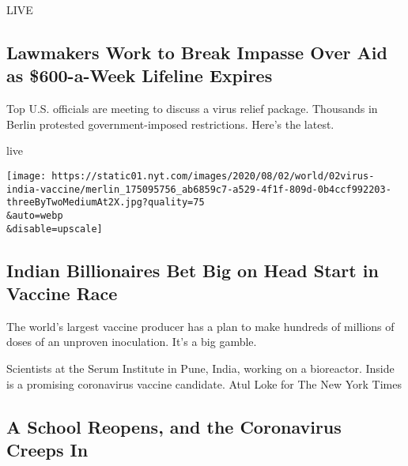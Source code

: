 \href{/2020/08/01/world/coronavirus-covid-19.html}{}

LIVE

\hypertarget{lawmakers-work-to-break-impasse-over-aid-as-600-a-week-lifeline-expires}{%
\subsection{Lawmakers Work to Break Impasse Over Aid as \$600-a-Week
Lifeline
Expires}\label{lawmakers-work-to-break-impasse-over-aid-as-600-a-week-lifeline-expires}}

Top U.S. officials are meeting to discuss a virus relief package.
Thousands in Berlin protested government-imposed restrictions. Here's
the latest.

live

\href{/2020/08/01/world/asia/coronavirus-vaccine-india.html}{}

\texttt{[image: https://static01.nyt.com/images/2020/08/02/world/02virus-india-vaccine/merlin\_175095756\_ab6859c7-a529-4f1f-809d-0b4ccf992203-threeByTwoMediumAt2X.jpg?quality=75\\\&auto=webp\\\&disable=upscale]}

\href{/2020/08/01/world/asia/coronavirus-vaccine-india.html}{}

\hypertarget{indian-billionaires-bet-big-on-head-start-in-vaccine-race}{%
\subsection{Indian Billionaires Bet Big on Head Start in Vaccine
Race}\label{indian-billionaires-bet-big-on-head-start-in-vaccine-race}}

The world's largest vaccine producer has a plan to make hundreds of
millions of doses of an unproven inoculation. It's a big gamble.

\href{/2020/08/01/world/asia/coronavirus-vaccine-india.html}{}

Scientists at the Serum Institute in Pune, India, working on a
bioreactor. Inside is a promising coronavirus vaccine candidate. Atul
Loke for The New York Times

\href{/2020/08/01/us/schools-reopening-indiana-coronavirus.html}{}

\hypertarget{a-school-reopens-and-the-coronavirus-creeps-in}{%
\subsection{A School Reopens, and the Coronavirus Creeps
In}\label{a-school-reopens-and-the-coronavirus-creeps-in}}

